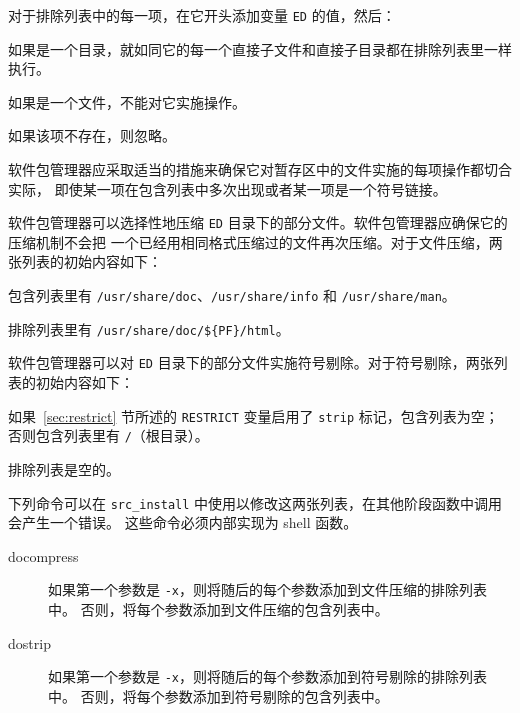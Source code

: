 对于排除列表中的每一项，在它开头添加变量 \texttt{ED} 的值，然后：

\begin{compactitem}
\item 如果是一个目录，就如同它的每一个直接子文件和直接子目录都在排除列表里一样执行。
\item 如果是一个文件，不能对它实施操作。
\item 如果该项不存在，则忽略。
\end{compactitem}

软件包管理器应采取适当的措施来确保它对暂存区中的文件实施的每项操作都切合实际，
即使某一项在包含列表中多次出现或者某一项是一个符号链接。

软件包管理器可以选择性地压缩 \texttt{ED} 目录下的部分文件。软件包管理器应确保它的压缩机制不会把
一个已经用相同格式压缩过的文件再次压缩。对于文件压缩，两张列表的初始内容如下：

\begin{compactitem}
\item 包含列表里有 \texttt{/usr/share/doc}、\texttt{/usr/share/info} 和 \texttt{/usr/share/man}。
\item 排除列表里有 \texttt{/usr/share/doc/\$\{PF\}/html}。
\end{compactitem}

软件包管理器可以对 \texttt{ED} 目录下的部分文件实施符号剔除。对于符号剔除，两张列表的初始内容如下：

\begin{compactitem}
\item 如果~\ref{sec:restrict} 节所述的 \texttt{RESTRICT} 变量启用了 \texttt{strip}
    标记，包含列表为空；否则包含列表里有 \texttt{/}（根目录）。
\item 排除列表是空的。
\end{compactitem}

下列命令可以在 \texttt{src_install} 中使用以修改这两张列表，在其他阶段函数中调用会产生一个错误。
这些命令必须内部实现为 shell 函数。

\begin{description}
\item[docompress] 如果第一个参数是 \texttt{-x}，则将随后的每个参数添加到文件压缩的排除列表中。
    否则，将每个参数添加到文件压缩的包含列表中。

\item[dostrip] 如果第一个参数是 \texttt{-x}，则将随后的每个参数添加到符号剔除的排除列表中。
    否则，将每个参数添加到符号剔除的包含列表中。
\end{description}

